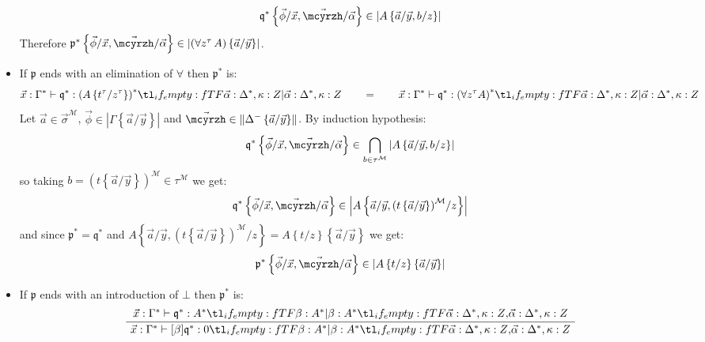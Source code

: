 \documentclass{CSML}
\newcommand*\ifpresent[3]{\tl_if_empty:fTF{#1}{#3}{#2}}
\newcommand*\AXM[1]{\AxiomC{$#1$}}
\newcommand*\UIM[1]{\UnaryInfC{$#1$}}
\newcommand*\DP\DisplayProof
\newcommand*\Entails{\mathrel{\vdash}}
\newcommand*\BarSep{\mathrel{|}}
\newcommand*\Sequent[3]{#1\Entails#2\ifpresent{#3}{\BarSep}{}#3}
\newcommand*\SortA{\sigma}
\newcommand*\SortB{\tau}
\newcommand*\LogSortedTerm[2]{#1^{#2}}
\newcommand*\LogTermA{t}
\newcommand*\LogVarB{y}
\newcommand*\LogVarC{z}
\newcommand*\LogNeg[1]{{#1^-}}
\newcommand*\LogBot\bot
\newcommand*\LogFormA{A}
\newcommand*\LogProofA{\mathfrak{p}}
\newcommand*\LogProofB{\mathfrak{q}}
\newcommand*\LogSubst[1]{\left\{#1\right\}}
\newcommand*\ModM{\mathcal{M}}
\newcommand*\ModElemA{a}
\newcommand*\ModElemB{b}
\newcommand*\ModMInterp[1]{{#1}^\ModM}
\newcommand*\LmSortBot0
\newcommand*\LmSortExtract{Z}
\newcommand*\LmTerm[2]{#1\mathrel{:}#2}
\newcommand*\LmVarA{x}
\newcommand*\LmMVarA\alpha
\newcommand*\LmMVarB\beta
\newcommand*\LmRuleBotIntroFirst[5]{\Sequent{#1}{\LmTerm{#4}{#5}}{\LmTerm{#3}{#5}}\ifpresent{#2}{,}{}#2}
\newcommand*\LmRuleBotIntroConcl[5]{\Sequent{#1}{\LmTerm{[#3]#4}{\LmSortBot}}{\LmTerm{#3}{#5}}\ifpresent{#2}{,}{}#2}
\newcommand*\LmRuleBotIntro[5]{\AXM{\LmRuleBotIntroFirst{#1}{#2}{#3}{#4}{#5}}\UIM{\LmRuleBotIntroConcl{#1}{#2}{#3}{#4}{#5}}\DP}
\newcommand*\LmInterpForm[1]{{#1}^*}
\newcommand*\LmInterpProof[1]{{#1}^*}
\newcommand*\CatRCHomA\phi
\newcommand*\CatCHomA\mcyrzh
\newcommand*\RealValNeg[1]{\left\|#1\right\|}
\newcommand*\RealVal[1]{\left|#1\right|}
\begin{document}
\begin{itemize}
$$\LmInterpProof{\LogProofB}\LogSubst{\vec{\CatRCHomA}/\vec{\LmVarA},\vec{\CatCHomA}/\vec{\LmMVarA}}\in\RealVal{\LogFormA\LogSubst{\vec{\ModElemA}/\vec{\LogVarB},\ModElemB/\LogVarC}}$$
Therefore $\LmInterpProof{\LogProofA}\LogSubst{\vec{\CatRCHomA}/\vec{\LmVarA},\vec{\CatCHomA}/\vec{\LmMVarA}}\in\RealVal{\left(\forall\LogSortedTerm{\LogVarC}{\SortB}\,\LogFormA\right)\LogSubst{\vec{\ModElemA}/\vec{\LogVarB}}}$.
\item If $\LogProofA$ ends with an elimination of $\forall$ then $\LmInterpProof{\LogProofA}$ is:
$$\Sequent{\LmTerm{\vec{\LmVarA}}{\LmInterpForm{\Gamma}}}{\LmTerm{\LmInterpProof{\LogProofB}}{\LmInterpForm{\left(\LogFormA\LogSubst{\LogSortedTerm{\LogTermA}{\SortB}/\LogSortedTerm{\LogVarC}{\SortB}}\right)}}}{\LmTerm{\vec{\LmMVarA}}{\LmInterpForm{\Delta}},\LmTerm{\kappa}{\LmSortExtract}}\qquad=\qquad\Sequent{\LmTerm{\vec{\LmVarA}}{\LmInterpForm{\Gamma}}}{\LmTerm{\LmInterpProof{\LogProofB}}{\LmInterpForm{\left(\forall\LogSortedTerm{\LogVarC}{\SortB}\LogFormA\right)}}}{\LmTerm{\vec{\LmMVarA}}{\LmInterpForm{\Delta}},\LmTerm{\kappa}{\LmSortExtract}}$$
Let $\vec{\ModElemA}\in\ModMInterp{\vec{\SortA}}$, $\vec{\CatRCHomA}\in\RealVal{\Gamma\LogSubst{\vec{\ModElemA}/\vec{\LogVarB}}}$ and $\vec{\CatCHomA}\in\RealValNeg{\LogNeg{\Delta}\LogSubst{\vec{\ModElemA}/\vec{\LogVarB}}}$. By induction hypothesis:
$$\LmInterpProof{\LogProofB}\LogSubst{\vec{\CatRCHomA}/\vec{\LmVarA},\vec{\CatCHomA}/\vec{\LmMVarA}}\in\bigcap_{\ModElemB\in\ModMInterp{\SortB}}\RealVal{\LogFormA\LogSubst{\vec{\ModElemA}/\vec{\LogVarB},\ModElemB/\LogVarC}}$$
so taking $\ModElemB=\ModMInterp{\left(\LogTermA\LogSubst{\vec{\ModElemA}/\vec{\LogVarB}}\right)}\in\ModMInterp{\SortB}$ we get:
$$\LmInterpProof{\LogProofB}\LogSubst{\vec{\CatRCHomA}/\vec{\LmVarA},\vec{\CatCHomA}/\vec{\LmMVarA}}\in\RealVal{\LogFormA\LogSubst{\vec{\ModElemA}/\vec{\LogVarB},\ModMInterp{\left(\LogTermA\LogSubst{\vec{\ModElemA}/\vec{\LogVarB}}\right)}/\LogVarC}}$$
and since $\LmInterpProof{\LogProofA}=\LmInterpProof{\LogProofB}$ and $\LogFormA\LogSubst{\vec{\ModElemA}/\vec{\LogVarB},\ModMInterp{\left(\LogTermA\LogSubst{\vec{\ModElemA}/\vec{\LogVarB}}\right)}/\LogVarC}=\LogFormA\LogSubst{\LogTermA/\LogVarC}\LogSubst{\vec{\ModElemA}/\vec{\LogVarB}}$ we get:
$$\LmInterpProof{\LogProofA}\LogSubst{\vec{\CatRCHomA}/\vec{\LmVarA},\vec{\CatCHomA}/\vec{\LmMVarA}}\in\RealVal{\LogFormA\LogSubst{\LogTermA/\LogVarC}\LogSubst{\vec{\ModElemA}/\vec{\LogVarB}}}$$
\item If $\LogProofA$ ends with an introduction of $\LogBot$ then $\LmInterpProof{\LogProofA}$ is:
$$\LmRuleBotIntro{\LmTerm{\vec{\LmVarA}}{\LmInterpForm{\Gamma}}}{\LmTerm{\vec{\LmMVarA}}{\LmInterpForm{\Delta}},\LmTerm{\kappa}{\LmSortExtract}}{\LmMVarB}{\LmInterpProof{\LogProofB}}{\LmInterpForm{\LogFormA}}$$

\end{itemize}
\end{document}
